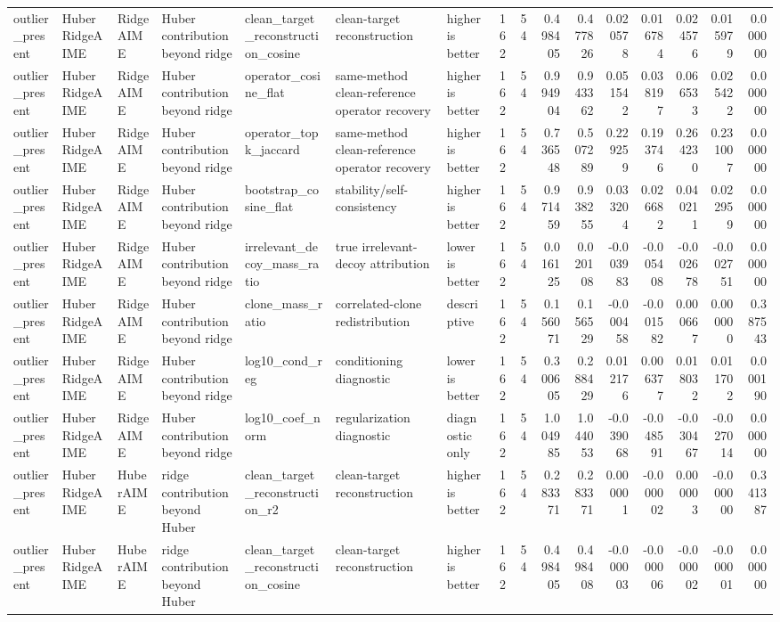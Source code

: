 \begin{table}[t]
\begin{tabular}{lllllllrrrrrrrrr}
outlier_present & HuberRidgeAIME & RidgeAIME & Huber contribution beyond ridge & clean_target_reconstruction_cosine & clean-target reconstruction & higher is better & 162 & 54 & 0.498405 & 0.477826 & 0.020578 & 0.016784 & 0.024576 & 0.015979 & 0.000000 \\
outlier_present & HuberRidgeAIME & RidgeAIME & Huber contribution beyond ridge & operator_cosine_flat & same-method clean-reference operator recovery & higher is better & 162 & 54 & 0.994904 & 0.943362 & 0.051542 & 0.038197 & 0.066533 & 0.025422 & 0.000000 \\
outlier_present & HuberRidgeAIME & RidgeAIME & Huber contribution beyond ridge & operator_topk_jaccard & same-method clean-reference operator recovery & higher is better & 162 & 54 & 0.736548 & 0.507289 & 0.229259 & 0.193746 & 0.264230 & 0.231007 & 0.000000 \\
outlier_present & HuberRidgeAIME & RidgeAIME & Huber contribution beyond ridge & bootstrap_cosine_flat & stability/self-consistency & higher is better & 162 & 54 & 0.971459 & 0.938255 & 0.033204 & 0.026682 & 0.040211 & 0.022959 & 0.000000 \\
outlier_present & HuberRidgeAIME & RidgeAIME & Huber contribution beyond ridge & irrelevant_decoy_mass_ratio & true irrelevant-decoy attribution & lower is better & 162 & 54 & 0.016125 & 0.020108 & -0.003983 & -0.005408 & -0.002678 & -0.002751 & 0.000000 \\
outlier_present & HuberRidgeAIME & RidgeAIME & Huber contribution beyond ridge & clone_mass_ratio & correlated-clone redistribution & descriptive & 162 & 54 & 0.156071 & 0.156529 & -0.000458 & -0.001582 & 0.000667 & 0.000000 & 0.387543 \\
outlier_present & HuberRidgeAIME & RidgeAIME & Huber contribution beyond ridge & log10_cond_reg & conditioning diagnostic & lower is better & 162 & 54 & 0.300605 & 0.288429 & 0.012176 & 0.006377 & 0.018032 & 0.011702 & 0.000190 \\
outlier_present & HuberRidgeAIME & RidgeAIME & Huber contribution beyond ridge & log10_coef_norm & regularization diagnostic & diagnostic only & 162 & 54 & 1.004985 & 1.044053 & -0.039068 & -0.048591 & -0.030467 & -0.027014 & 0.000000 \\
outlier_present & HuberRidgeAIME & HuberAIME & ridge contribution beyond Huber & clean_target_reconstruction_r2 & clean-target reconstruction & higher is better & 162 & 54 & 0.283371 & 0.283371 & 0.000001 & -0.000002 & 0.000003 & -0.000000 & 0.341387 \\
outlier_present & HuberRidgeAIME & HuberAIME & ridge contribution beyond Huber & clean_target_reconstruction_cosine & clean-target reconstruction & higher is better & 162 & 54 & 0.498405 & 0.498408 & -0.000003 & -0.000006 & -0.000002 & -0.000001 & 0.000000 \\

\end{tabular}
\end{table}
